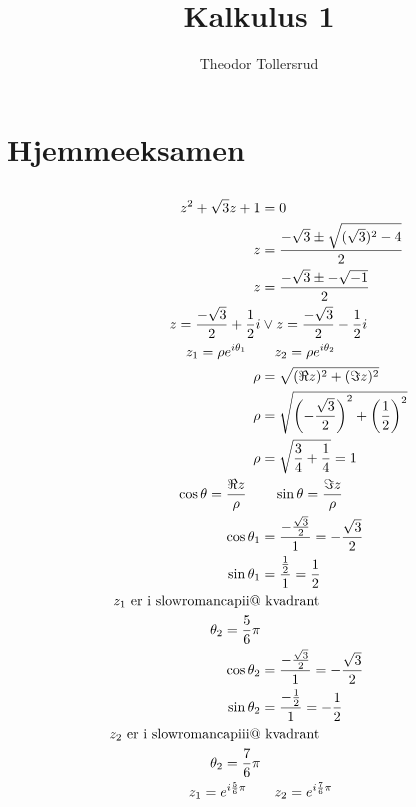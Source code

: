 \documentclass[defaultpackages]{cheatsheet}
\title{Kalkulus 1}
\author{Theodor Tollersrud}
\makeatletter
\newcommand*{\rom}[1]{\expandafter\@slowromancap\romannumeral #1@}
\makeatother
\begin{document}
\tableofcontents

	\section{Hjemmeeksamen}
	\subsection{}
	\subsubsection{}
	\begin{align*}
		z^2+\sqrt{3}z+1&=0\\
		z&=\frac{-\sqrt{3} \pm \sqrt{(\sqrt{3})^2 - 4}}{2}\\
		z&=\frac{-\sqrt{3} \pm -\sqrt{-1}}{2}\\
		z = \frac{-\sqrt{3}}{2} + \frac{1}{2}i &\vee z = \frac{-\sqrt{3}}{2} - \frac{1}{2} i\\
		z_1 = \rho e ^ {i\theta_1}\quad&\quad z_2 = \rho e ^ {i\theta_2}\\
		\rho &= \sqrt{(\Re z)^2 + (\Im z)^2}\\\
		\rho &= \sqrt{\left(-\frac{\sqrt{3}}{2}\right)^2 + \left(\frac{1}{2}\right)^2}\\
		\rho &= \sqrt{\frac{3}{4} + \frac{1}{4}} = 1\\
		\cos \theta = \frac{\Re z}{\rho} \quad & \quad \sin \theta = \frac{\Im z}{\rho}\\
		\cos \theta_1 &= \frac{-\frac{\sqrt{3}}{2}}{1} = -\frac{\sqrt{3}}{2}\\
		\sin \theta_1 &= \frac{\frac{1}{2}}{1} = \frac{1}{2}\\
		z_1 \text{ er i \rom{2}}&\text{ kvadrant}\\
		\theta_2 = \frac{5}{6}\pi\\
		\cos \theta_2 &= \frac{-\frac{\sqrt{3}}{2}}{1} = -\frac{\sqrt{3}}{2}\\
		\sin \theta_2 &= \frac{-\frac{1}{2}}{1} = -\frac{1}{2}\\
		z_2 \text{ er i \rom{3}}&\text{ kvadrant}\\
		\theta_2 = \frac{7}{6}\pi\\
		z_1 = e^{i\frac{5}{6}\pi}\quad&\quad z_2=e^{i\frac{7}{6}\pi}\\
	\end{align*}
\end{document}
